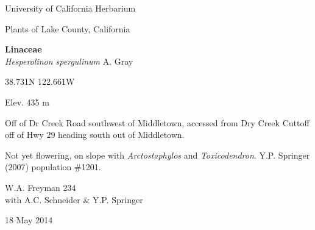 \documentclass[letterpaper,10pt]{article}
\begin{document}
\begin{minipage}[t]{0.40\textwidth}

\begin{center}
University of California Herbarium \\
\begin{large}
Plants of Lake County, California \\
\end{large}
\vspace{\baselineskip}
\textbf{Linaceae} \\
\textit{Hesperolinon spergulinum} A. Gray\\
\end{center}

\begin{footnotesize}

\begin{multicols}{2}
38.731\textdegree N 122.661\textdegree W
\columnbreak
\begin{flushright}
Elev. 435 m
\end{flushright}
\end{multicols}

Off of Dr Creek Road southwest of Middletown, accessed from Dry Creek Cuttoff off of Hwy 29 heading south out of Middletown.
\vspace{\baselineskip}

Not yet flowering, on slope with \textit{Arctostaphylos} and \textit{Toxicodendron}. Y.P. Springer (2007) population \#1201.

\begin{multicols}{2}
W.A. Freyman 234 \\
with A.C. Schneider \& Y.P. Springer
\columnbreak
\begin{flushright}
18 May 2014
\end{flushright}
\end{multicols}

\end{footnotesize}

\end{minipage}
%
\hspace{2cm}
%
\end{document}

